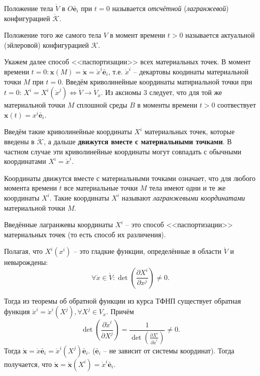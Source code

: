 Положение тела $\mathring{V}$ в $O\bar{\mathbf{e}}_i$ при $t=0$ называется
\emph{отсчётной}
(\emph{лагранжевой}) конфигурацией $\mathring{\mathcal{K}}$.

Положение того же самого тела $V$ в момент времени $t > 0$ называется актуальной (эйлеровой)
конфигурацией $\mathcal{K}$.

Укажем далее способ <<паспортизации>> всех материальных точек. В момент времени $t = 0 :
\mathbf{x}(M) = \mathring{\mathbf{x}} = \mathring{x}^{i} \bar{\mathbf{e}}_i$, т.е. $\mathring{x}^{i}$
-- декартовы коодинаты материальной
точки $M$ при $t=0$. Введём криволинейные координаты матириальной точки при $t=0$:
$X^i = X^i(\mathring{x}^j) \Leftrightarrow \mathring{V} \to \mathring{V}_x$. Из аксиомы 3 следует, что для той же 
материальной точки $M$ сплошной среды $B$ в моменты времени $t > 0$ соотвествует $\mathbf{x}(t) = x^i \bar{\mathbf{e}}_i$.

Введём такие криволинейные координаты $X^i$ материальных точек, которые введены в
$\mathring{\mathcal{K}}$, а дальше \textbf{движутся вместе с материальными точками}. В частном
случае эти криволинейные координаты могут совпадать с обычными координатами $X^i = \mathring{x}^i$.

\begin{figure}[H]
	\centering
	
\end{figure}


Координаты движутся вместе с материальными точками означает, что для любого момента времени $t$ 
все материальные точки $M$ тела имеют одни и те же координаты $X^i$. Такие координаты $X^i$ называют
\emph{лагранжевыми координатами} материальной точки $M$.

Введённые лагранжевы координаты $X^i$ -- это способ <<паспортизации>> материальных точек (то есть
способ их различения).

Полагая, что $X^i(x^i)$ -- это гладкие функции, определённые в области $\mathring{V}$ и невырождены:
\[
  \forall \mathring{x} \in \mathring V : \det \left( \frac{\partial X^i}{\partial x^j}  \right) \neq 0.
\]

Тогда из теоремы об обратной функции из курса ТФНП существует обратная функция $\mathring{x}^i
= \mathring{x}^i (X^j), \forall X^j \in V_x$. Причём
\[
  \det \left( \frac{\partial \mathring{x}^i}{\partial X^{j}}  \right)
  = \frac{1}{\det \left( \frac{\partial X^i}{\partial \mathring{x}^i}  \right) } \neq 0.
\]
Тогда $\mathring{\mathbf{x}} = \mathring{x} \bar{\mathbf{e}}_i = \mathring{x}^i (X^j) \bar{\mathbf{e}}_i$.
($\bar{\mathbf{e}}_i$ -- не зависит от системы координат). Тогда получается, что
$\mathring{\mathbf{x}} = \mathring{\mathbf{x}} ( X^i) = \mathring{x}^i \bar{\mathbf{e}}_i$.

